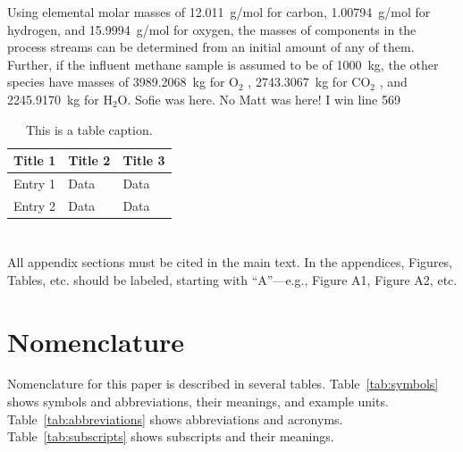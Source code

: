 \documentclass[journal,article,submit,pdftex,moreauthors]{Definitions/mdpi}
\begin{document}
Using elemental molar masses of 12.011~g/mol for carbon,
1.00794~g/mol for hydrogen,
and 15.9994~g/mol for oxygen,
the masses of components in the process streams
can be determined from an initial amount of any of them.
Further, if the influent methane sample is assumed
to be of 1000~kg,
the other species have masses of 3989.2068~kg for O$_2$ ,
2743.3067~kg for CO$_2$ ,
and 2245.9170~kg for H$_2$O.
Sofie was here.
No Matt was here!
I win line 569
\begin{table}
\caption{This is a table caption.\label{tab5}}
\begin{tabularx}{\textwidth}{CCC}
\toprule
\textbf{Title 1}	& \textbf{Title 2}	& \textbf{Title 3}\\
\midrule
Entry 1		& Data			& Data\\
Entry 2		& Data			& Data\\
\bottomrule
\end{tabularx}
\end{table}

\section[\appendixname~\thesection]{}
All appendix sections must be cited in the main text. In the appendices, Figures, Tables, etc. should be labeled, starting with ``A''---e.g., Figure A1, Figure A2, etc.


\section[\appendixname~\thesection]{Nomenclature}
\label{sec:nomenclature}


Nomenclature for this paper is described in several tables.
Table~\ref{tab:symbols} shows symbols and abbreviations, their meanings, and example units.
Table~\ref{tab:abbreviations} shows abbreviations and acronyms.
Table~\ref{tab:subscripts} shows subscripts and their meanings.



\end{document}
